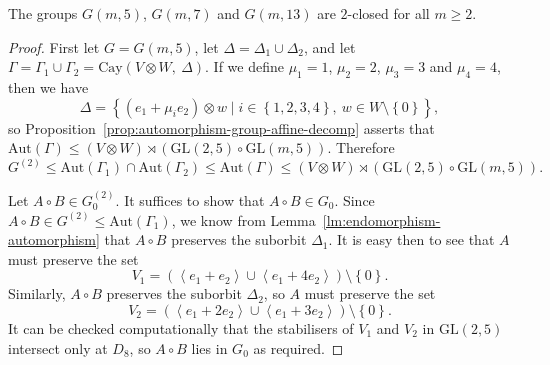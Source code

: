 \documentclass[ALCO, Unicode]{cedram}
\newcommand{\Aut}{\mathrm{Aut}}
\newcommand{\Cay}{\mathrm{Cay}}
\newcommand{\GL}{\mathrm{GL}}
\begin{document}
\begin{theorem} \label{thm:2-closed}
The groups $G{\left(m, 5 \right)}$, $G{\left(m, 7 \right)}$ and $G{\left(m, 13 \right)}$ are $2$-closed for all $m \geqslant 2$.
\end{theorem}
\begin{proof}
First let $G = G{\left(m, 5 \right)}$, let $\Delta = \Delta_1 \cup \Delta_2$, and let $\Gamma = \Gamma_1 \cup \Gamma_2 = \Cay{\left(V \otimes W,\ \Delta \right)}$. If we define $\mu_1 = 1$, $\mu_2 = 2$, $\mu_3 = 3$ and $\mu_4 = 4$, then we have
\begin{displaymath}
    \Delta = {\left\{\left(e_1 + \mu_i e_2 \right) \otimes w \mid i \in {\left\{1, 2, 3, 4 \right\}},\ w \in W \setminus \left\{0 \right\}\right\}},
\end{displaymath}
so Proposition~\ref{prop:automorphism-group-affine-decomp} asserts that $\Aut{\left(\Gamma \right)} \leqslant \left(V \otimes W \right) \rtimes \left(\GL{\left(2, 5 \right)} \circ \GL{\left(m, 5 \right)}\right)$. Therefore
\begin{displaymath}
    G^{\left(2 \right)} \leqslant \Aut{\left(\Gamma_1 \right)} \cap \Aut{\left(\Gamma_2 \right)} \leqslant \Aut{\left(\Gamma \right)} \leqslant \left(V \otimes W \right) \rtimes {\left(\GL{\left(2, 5 \right)} \circ \GL{\left(m, 5 \right)}\right)}.
\end{displaymath}

Let $A \circ B \in G^{\left(2 \right)}_0$. It suffices to show that $A \circ B \in G_0$. Since $A \circ B \in G^{\left(2 \right)} \leqslant \Aut{\left(\Gamma_1 \right)}$, we know from Lemma~\ref{lm:endomorphism-automorphism} that $A \circ B$ preserves the suborbit $\Delta_1$. It is easy then to see that $A$ must preserve the set
\begin{displaymath}
    V_1 = \left(\left<e_1 + e_2 \right> \cup \left<e_1 + 4 e_2 \right> \right) \setminus {\left\{0 \right\}}.
\end{displaymath}
Similarly, $A \circ B$ preserves the suborbit $\Delta_2$, so $A$ must preserve the set
\begin{displaymath}
    V_2 = \left(\left<e_1 + 2 e_2 \right> \cup \left<e_1 + 3 e_2 \right> \right) \setminus {\left\{0 \right\}}.
\end{displaymath}
It can be checked computationally that the stabilisers of $V_1$ and $V_2$ in $\GL{\left(2, 5 \right)}$ intersect only at $D_8$, so $A \circ B$ lies in $G_0$ as required.


\end{proof}
\end{document}
